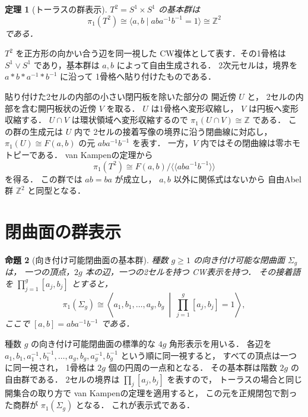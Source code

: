 \documentclass[a5paper,10pt,onecolumn]{jsarticle}
\makeatletter
\theoremstyle{mathnotetheorem}
\newtheorem{theorem}{定理}[section]
\newtheorem{proposition}[theorem]{命題}
\renewcommand{\proofname}{証明}
\renewenvironment{proof}[1][\proofname]{%
  \par\pushQED{\qed}\normalfont\topsep4\p@\@plus2\p@\relax
  \trivlist\item[\hskip\labelsep\bfseries #1]\ignorespaces
}{\popQED\endtrivlist\@endpefalse}
\makeatother
\begin{document}
\begin{theorem}[トーラスの群表示]\label{thm:torus}
$T^2=S^1\times S^1$ の基本群は
\[
 \pi_1(T^2)\cong
 \langle a,b\mid aba^{-1}b^{-1}=1\rangle
 \cong\mathbb Z^2
\]
である．
\end{theorem}
\begin{proof}
$T^2$ を正方形の向かい合う辺を同一視した
CW複体として表す．その1骨格は
$S^1\vee S^1$ であり，基本群は
$a,b$ によって自由生成される．
2次元セルは，境界を
$a*b*a^{-1}*b^{-1}$ に沿って
1骨格へ貼り付けたものである．

貼り付けた2セルの内部の小さい閉円板を除いた部分の
開近傍 $U$ と，
2セルの内部を含む開円板状の近傍 $V$ を取る．
$U$ は1骨格へ変形収縮し，
$V$ は円板へ変形収縮する．
$U\cap V$ は環状領域へ変形収縮するので
$\pi_1(U\cap V)\cong\mathbb Z$ である．
この群の生成元は $U$ 内で
2セルの接着写像の境界に沿う閉曲線に対応し，
$\pi_1(U)\cong F(a,b)$ の元
$aba^{-1}b^{-1}$ を表す．
一方，$V$ 内ではその閉曲線は零ホモトピーである．
van Kampenの定理から
\[
 \pi_1(T^2)\cong
 F(a,b)/\langle\!\langle aba^{-1}b^{-1}\rangle\!\rangle
\]
を得る．
この群では $ab=ba$ が成立し，
$a,b$ 以外に関係式はないから
自由Abel群 $\mathbb Z^2$ と同型となる．
\end{proof}

\section{閉曲面の群表示}

\begin{proposition}[向き付け可能閉曲面の基本群]
\label{prop:surface}
種数 $g\ge1$ の向き付け可能な閉曲面 $\Sigma_g$ は，
一つの頂点，$2g$ 本の辺，一つの2セルを持つ
CW表示を持つ．
その接着語を
$\prod_{j=1}^g[a_j,b_j]$ とすると，
\[
 \pi_1(\Sigma_g)\cong
 \left\langle
 a_1,b_1,\dots,a_g,b_g
 \ \middle|\
 \prod_{j=1}^g[a_j,b_j]=1
 \right\rangle,
\]
ここで $[a,b]=aba^{-1}b^{-1}$ である．
\end{proposition}
\begin{proof}
種数 $g$ の向き付け可能閉曲面の標準的な
$4g$ 角形表示を用いる．
各辺を
$a_1,b_1,a_1^{-1},b_1^{-1},\dots,
 a_g,b_g,a_g^{-1},b_g^{-1}$
という順に同一視すると，
すべての頂点は一つに同一視され，
1骨格は $2g$ 個の円周の一点和となる．
その基本群は階数 $2g$ の自由群である．
2セルの境界は
$\prod_j[a_j,b_j]$ を表すので，
トーラスの場合と同じ開集合の取り方で
van Kampenの定理を適用すると，
この元を正規閉包で割った商群が
$\pi_1(\Sigma_g)$ となる．
これが表示式である．
\end{proof}
\end{document}
